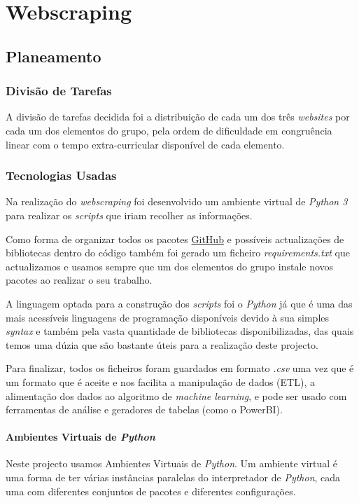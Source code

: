 \chapter{Webscraping}
\label{cap3}

\section{Planeamento}
\subsection{Divisão de Tarefas}

A divisão de tarefas decidida foi a distribuição de cada um dos três \textit{websites} por cada um dos elementos do grupo, pela ordem de dificuldade em congruência linear com o tempo extra-curricular disponível de cada elemento.

\subsection{Tecnologias Usadas}
Na realização do \textit{webscraping} foi desenvolvido um ambiente virtual de \textit{Python 3} para realizar os \textit{scripts} que iriam recolher as informações.

Como forma de organizar todos os pacotes \href{https://github.com/CatKinKitKat/pi2021}{GitHub} e possíveis actualizações de bibliotecas dentro do código também foi gerado um ficheiro \textit{requirements.txt} que actualizamos e usamos sempre que um dos elementos do grupo instale novos pacotes ao realizar o seu trabalho.

A linguagem optada para a construção dos \textit{scripts} foi o \textit{Python} já que é uma das mais acessíveis linguagens de programação disponíveis devido à sua simples \textit{syntax} e também pela vasta quantidade de bibliotecas disponibilizadas, das quais temos uma dúzia que são bastante úteis para a realização deste projecto.

Para finalizar, todos os ficheiros foram guardados em formato \textit{.csv} uma vez que é um formato que é aceite e nos facilita a manipulação de dados (ETL), a alimentação dos dados ao algoritmo de \textit{machine learning}, e pode ser usado com ferramentas de análise e geradores de tabelas (como o PowerBI).

\subsubsection{Ambientes Virtuais de \textit{Python}}
Neste projecto usamos Ambientes Virtuais de \textit{Python}. Um ambiente virtual é uma forma de ter várias instâncias paralelas do interpretador de \textit{Python}, cada uma com diferentes conjuntos de pacotes e diferentes configurações.

